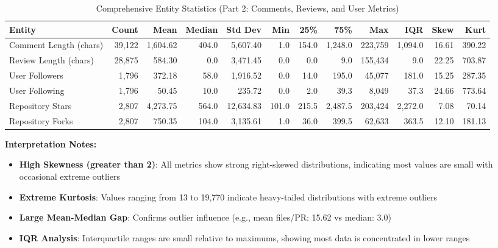 \documentclass[11pt]{article}
\begin{document}
\begin{table}[H]
\centering
\caption{Comprehensive Entity Statistics (Part 2: Comments, Reviews, and User Metrics)}
\tiny
\begin{tabular}{@{}lrrrrrrrrrrr@{}}
\toprule
\textbf{Entity} & \textbf{Count} & \textbf{Mean} & \textbf{Median} & \textbf{Std Dev} & \textbf{Min} & \textbf{25\%} & \textbf{75\%} & \textbf{Max} & \textbf{IQR} & \textbf{Skew} & \textbf{Kurt} \\
\midrule
Comment Length (chars) & 39,122 & 1,604.62 & 404.0 & 5,607.40 & 1.0 & 154.0 & 1,248.0 & 223,759 & 1,094.0 & 16.61 & 390.22 \\
Review Length (chars) & 28,875 & 584.30 & 0.0 & 3,471.45 & 0.0 & 0.0 & 9.0 & 155,434 & 9.0 & 22.25 & 703.87 \\
User Followers & 1,796 & 372.18 & 58.0 & 1,916.52 & 0.0 & 14.0 & 195.0 & 45,077 & 181.0 & 15.25 & 287.35 \\
User Following & 1,796 & 50.45 & 10.0 & 235.72 & 0.0 & 2.0 & 39.3 & 8,049 & 37.3 & 24.66 & 773.64 \\
Repository Stars & 2,807 & 4,273.75 & 564.0 & 12,634.83 & 101.0 & 215.5 & 2,487.5 & 203,424 & 2,272.0 & 7.08 & 70.14 \\
Repository Forks & 2,807 & 750.35 & 104.0 & 3,135.61 & 1.0 & 36.0 & 399.5 & 62,633 & 363.5 & 12.10 & 181.13 \\
\bottomrule
\end{tabular}
\end{table}

\textbf{Interpretation Notes:}
\begin{itemize}
    \item \textbf{High Skewness (greater than 2)}: All metrics show strong right-skewed distributions, indicating most values are small with occasional extreme outliers
    \item \textbf{Extreme Kurtosis}: Values ranging from 13 to 19,770 indicate heavy-tailed distributions with extreme outliers
    \item \textbf{Large Mean-Median Gap}: Confirms outlier influence (e.g., mean files/PR: 15.62 vs median: 3.0)
    \item \textbf{IQR Analysis}: Interquartile ranges are small relative to maximums, showing most data is concentrated in lower ranges
\end{itemize}
\end{document}
